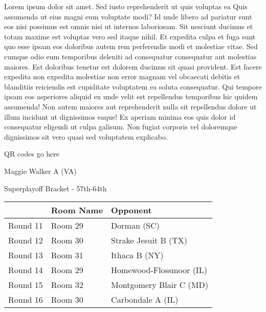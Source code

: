 \documentclass{article}%
\begin{document}
\vspace*{8pt}%
\linebreak%
\newline%
\newline%
    Lorem ipsum dolor sit amet. Sed iusto reprehenderit ut quis voluptas ea Quis assumenda ut eius magni eum voluptate modi? Id unde libero ad pariatur sunt eos nisi possimus est omnis nisi ut internos laboriosam. Sit nesciunt ducimus et totam maxime est voluptas vero sed itaque nihil. Et expedita culpa et fuga sunt quo esse ipsam eos doloribus autem rem perferendis modi et molestiae vitae.\newline%
\newline%
    Sed cumque odio eum temporibus deleniti ad consequatur consequatur aut molestias maiores. Est doloribus tenetur est dolorem ducimus sit quasi provident. Est facere expedita non expedita molestiae non error magnam vel obcaecati debitis et blanditiis reiciendis est cupiditate voluptatem ea soluta consequatur. Qui tempore ipsam eos asperiores aliquid ex unde velit est repellendus temporibus hic quidem assumenda!\newline%
\newline%
    Non autem maiores aut reprehenderit nulla sit repellendus dolore ut illum incidunt ut dignissimos eaque! Ex aperiam minima eos quis dolor id consequatur eligendi ut culpa galisum. Non fugiat corporis vel doloremque dignissimos sit vero quasi sed voluptatem explicabo.\newline%
\newline%
\vspace*{30pt}%
\begin{center}%
\begin{Huge}%
QR codes go here%
\end{Huge}%
\end{center}%
\newpage%
\begin{center}%
\begin{Huge}%
Maggie Walker A (VA)%
\end{Huge}%
\vspace*{8pt}%
\linebreak%
\begin{Large}%
Superplayoff Bracket {-} 57th{-}64th%
\end{Large}%
\end{center}%
%
\begin{tabularx}{\textwidth}{|c|Y|Y|}%
\hline%
&Room Name&Opponent\\%
\hline%
Round 11&Room 29&Dorman (SC)\\%
Round 12&Room 30&Strake Jesuit B (TX)\\%
Round 13&Room 31&Ithaca B (NY)\\%
Round 14&Room 29&Homewood{-}Flossmoor (IL)\\%
Round 15&Room 32&Montgomery Blair C (MD)\\%
Round 16&Room 30&Carbondale A (IL)\\%
\hline%
\end{tabularx}%
\end{document}
